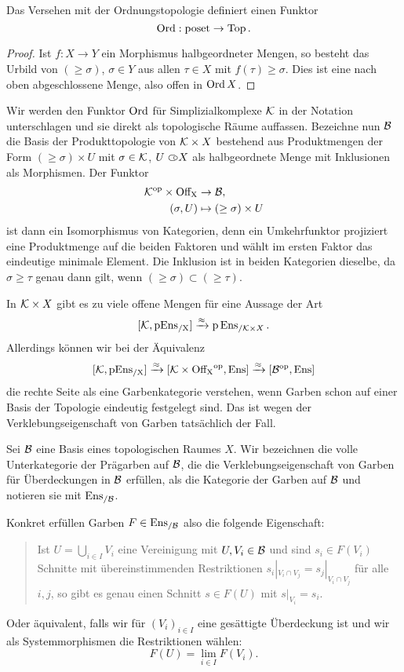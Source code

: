 \begin{lemma} \label{ord-functor}
  Das Versehen mit der Ordnungstopologie definiert einen Funktor
  \[ \operatorname{Ord}: \operatorname{poset} \to \operatorname{Top} . \]
\end{lemma}
\begin{proof}
  Ist $f: X \to Y$ ein Morphismus halbgeordneter Mengen, so besteht
  das Urbild von $(\geq \sigma)$, $\sigma \in Y$ aus allen $\tau \in
  X$ mit $f(\tau) \geq \sigma$. Dies ist eine nach oben abgeschlossene
  Menge, also offen in $\operatorname{Ord} X$.
\end{proof}
Wir werden den Funktor $\operatorname{Ord}$ für Simplizialkomplexe $\mathcal{K}$ in der
Notation unterschlagen und sie direkt als topologische Räume
auffassen. Bezeichne nun $\mathcal{B}$ die Basis der Produkttopologie von $\mathcal{K}
\times X$ bestehend aus Produktmengen der Form $(\geq \sigma) \times
U$ mit $\sigma \in \mathcal{K}$, $U \subset\kern-0.58em\circ X$ als halbgeordnete Menge mit
Inklusionen als Morphismen. Der Funktor
\begin{align*} \label{eq:prod-base}
  \mathcal{K}^\mathrm{op} \times \operatorname{Off_X} &\to \mathcal{B}, \\
  (\sigma, U) &\mapsto (\geq \sigma) \times U
\end{align*}
ist dann ein Isomorphismus von Kategorien, denn ein Umkehrfunktor
projiziert eine Produktmenge auf die beiden Faktoren und wählt im
ersten Faktor das eindeutige minimale Element. Die Inklusion ist in
beiden Kategorien dieselbe, da $\sigma \geq \tau$ genau dann gilt,
wenn $(\geq \sigma) \subset (\geq \tau)$.

In $\mathcal{K} \times X$ gibt es zu viele offene Mengen für eine Aussage der
Art
\[
  [\mathcal{K}, \operatorname{pEns_{/X}}] \xrightarrow{\approx} \operatorname{p}\operatorname{Ens}_{/\mathcal{K} \times X}.
\]
Allerdings können wir bei der Äquivalenz
\begin{equation} \label{eq:simp-comp-presheaf}
  [\mathcal{K}, \operatorname{pEns_{/X}}]
  \xrightarrow{\approx} {[\mathcal{K} \times \operatorname{Off_X}^\mathrm{op}, \operatorname{Ens}]}
  \xrightarrow{\approx} {[\mathcal{B}^\mathrm{op}, \operatorname{Ens}]}
\end{equation}
die rechte Seite als eine Garbenkategorie verstehen, wenn Garben schon
auf einer Basis der Topologie eindeutig festgelegt sind. Das ist wegen
der Verklebungseigenschaft von Garben tatsächlich der Fall.
\begin{defn}
  Sei $\mathcal{B}$ eine Basis eines topologischen Raumes $X$.  Wir bezeichnen
  die volle Unterkategorie der Prägarben auf $\mathcal{B}$, die die
  Verklebungseigenschaft von Garben für Überdeckungen in $\mathcal{B}$
  erfüllen, als die Kategorie der Garben auf $\mathcal{B}$ und notieren sie mit
  $\operatorname{Ens_{/\mathcal{B}}}$.
\end{defn}
Konkret erfüllen Garben $F \in \operatorname{Ens_{/\mathcal{B}}}$ also die folgende Eigenschaft:
\begin{quote}
  Ist $U = \bigcup_{i \in I} V_i$ eine Vereinigung mit $U, V_i \in
  \mathcal{B}$ und sind $s_i \in F(V_i)$ Schnitte mit
  übereinstimmenden Restriktionen $s_i |_{V_i \cap V_j} = s_j |_{V_i
    \cap V_j}$ für alle $i, j$, so gibt es genau einen Schnitt $s \in
  F(U)$ mit $s |_{V_i} = s_i$.
\end{quote}
Oder äquivalent, falls wir für $(V_i)_{i \in I}$ eine gesättigte
Überdeckung ist und wir als Systemmorphismen die Restriktionen wählen:
\[ F(U) = \lim_{i \in I} F(V_i) . \]

